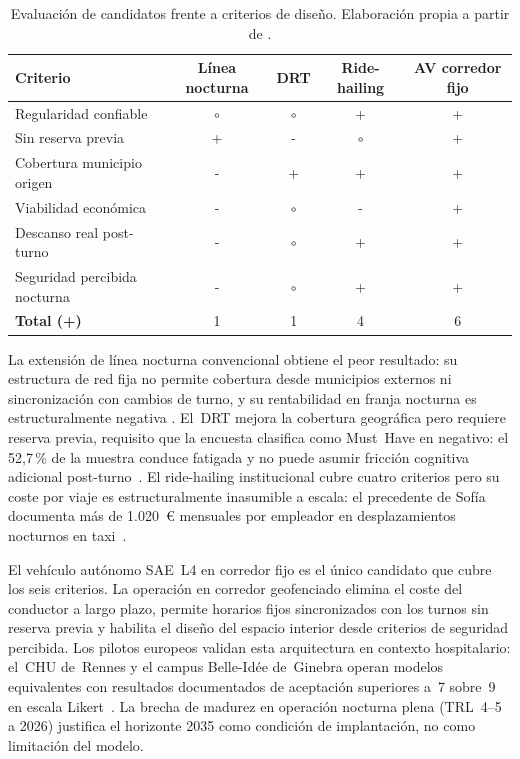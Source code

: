 \begin{table}[htbp]
\centering
\caption{Evaluación de candidatos frente a criterios de diseño.
  Elaboración propia a partir de \parencite{LouridoRegueira2026,
  AVENUE2023, SHOW2024Legacy, Estrada2021,
  K2Centrum2025DRT, Stagecoach2020Hull}.}
\label{tab:evaluacion-candidatos}
\small
\begin{tabular}{lcccc}
\toprule
\textbf{Criterio} &
\textbf{Línea nocturna} &
\textbf{DRT} &
\textbf{Ride-hailing} &
\textbf{AV corredor fijo} \\
\midrule
Regularidad confiable &
  $\circ$ & $\circ$ & + & + \\
Sin reserva previa &
  + & - & $\circ$ & + \\
Cobertura municipio origen &
  - & + & + & + \\
Viabilidad económica &
  - & $\circ$ & - & + \\
Descanso real post-turno &
  - & $\circ$ & + & + \\
Seguridad percibida nocturna &
  - & $\circ$ & + & + \\
\midrule
\textbf{Total (+)} &
  1 & 1 & 4 & 6 \\
\bottomrule
\end{tabular}
\end{table}

La extensión de línea nocturna convencional obtiene el peor
resultado: su estructura de red fija no permite cobertura desde
municipios externos ni sincronización con cambios de turno, y su
rentabilidad en franja nocturna es estructuralmente negativa
\parencite{Estrada2021}. El~\acs{DRT} mejora la cobertura
geográfica pero requiere reserva previa, requisito que la encuesta
clasifica como Must~Have en negativo: el 52,7\,\% de la muestra
conduce fatigada y no puede asumir fricción cognitiva adicional
post-turno~\parencite{LouridoRegueira2026}. El ride-hailing
institucional cubre cuatro criterios pero su coste por viaje es
estructuralmente inasumible a escala: el precedente de Sofía
documenta más de 1.020~€ mensuales por empleador en desplazamientos
nocturnos en taxi~\parencite{PlyushetvaBoussauw2020}.

El vehículo autónomo SAE~L4 en corredor fijo es el único candidato
que cubre los seis criterios. La operación en corredor geofenciado
elimina el coste del conductor a largo plazo, permite horarios
fijos sincronizados con los turnos sin reserva previa y habilita
el diseño del espacio interior desde criterios de seguridad
percibida. Los pilotos europeos validan esta arquitectura en
contexto hospitalario: el~\acs{CHU} de~Rennes y el campus
Belle-Idée de~Ginebra operan modelos equivalentes con resultados
documentados de aceptación superiores a~7 sobre~9 en escala
Likert~\parencite{SHOW2024Legacy, AVENUE2023}. La brecha de
madurez en operación nocturna plena (TRL~4--5 a 2026) justifica
el horizonte 2035 como condición de implantación, no como
limitación del modelo.

